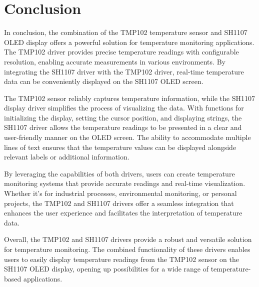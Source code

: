 \chapter{Conclusion}
In conclusion, the combination of the TMP102 temperature sensor and SH1107 OLED display offers a powerful solution for temperature monitoring applications. The TMP102 driver provides precise temperature readings with configurable resolution, enabling accurate measurements in various environments. By integrating the SH1107 driver with the TMP102 driver, real-time temperature data can be conveniently displayed on the SH1107 OLED screen.

The TMP102 sensor reliably captures temperature information, while the SH1107 display driver simplifies the process of visualizing the data. With functions for initializing the display, setting the cursor position, and displaying strings, the SH1107 driver allows the temperature readings to be presented in a clear and user-friendly manner on the OLED screen. The ability to accommodate multiple lines of text ensures that the temperature values can be displayed alongside relevant labels or additional information.

By leveraging the capabilities of both drivers, users can create temperature monitoring systems that provide accurate readings and real-time visualization. Whether it's for industrial processes, environmental monitoring, or personal projects, the TMP102 and SH1107 drivers offer a seamless integration that enhances the user experience and facilitates the interpretation of temperature data.

Overall, the TMP102 and SH1107 drivers provide a robust and versatile solution for temperature monitoring. The combined functionality of these drivers enables users to easily display temperature readings from the TMP102 sensor on the SH1107 OLED display, opening up possibilities for a wide range of temperature-based applications.